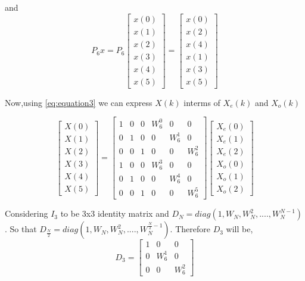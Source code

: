 \documentclass[journal,12pt,twocolumn]{IEEEtran}
\renewcommand\thesection{\arabic{section}}
\begin{document}
\begin{enumerate}[label=\thesection.\arabic*.,ref=\thesection.\theenumi]
and 
\begin{equation}
P_{6}x
=
P_{6}
\begin{bmatrix}
x(0) \\ 
x(1) \\ 
x(2) \\ 
x(3) \\ 
x(4) \\ 
x(5) 
\end{bmatrix}
=
\begin{bmatrix}
x(0) \\ 
x(2) \\ 
x(4) \\ 
x(1) \\ 
x(3) \\ 
x(5) 
\end{bmatrix}   
\end{equation}

Now,using \eqref{eq:equation3} we can express $X(k)$ interms of $X_{e}(k)$ and $X_{o}(k)$

\begin{equation}
\begin{bmatrix}
X(0) \\ 
X(1) \\ 
X(2) \\ 
X(3) \\ 
X(4) \\ 
X(5) 
\end{bmatrix}
=
\begin{bmatrix}
1 & 0 & 0 & W^{0}_{6} & 0 & 0\\
0 & 1 & 0 &  0 & W^{1}_{6} & 0\\
0 & 0 & 1 & 0 & 0 & W^{2}_{6}\\
1 & 0 & 0 & W^{3}_{6} & 0 & 0\\
0 & 1 & 0 & 0 & W^{4}_{6} & 0\\
0 & 0 & 1 & 0 & 0 & W^{5}_{6}
\end{bmatrix}
\begin{bmatrix}
X_{e}(0) \\ 
X_{e}(1) \\ 
X_{e}(2) \\ 
X_{o}(0) \\ 
X_{o}(1) \\ 
X_{o}(2)
\end{bmatrix}
\label{eq:equation4}
\end{equation}


Considering $I_{3}$ to be 3x3 identity matrix and $D_{N} = diag(1,W_{N},W_{N}^{2},....,W_{N}^{N-1})$ . So that $D_{\frac{N}{2}} = diag(1,W_{N},W_{N}^{2},....,W_{N}^{\frac{N}{2} -1})$. Therefore $D_{3}$ will be,
\begin{equation}
D_{3}=
\begin{bmatrix}
1 & 0 & 0 \\
0 & W^{1}_{6} & 0 \\
0 & 0 & W^{2}_{6}
\end{bmatrix}
\end{equation}


\end{enumerate}
\end{document}
